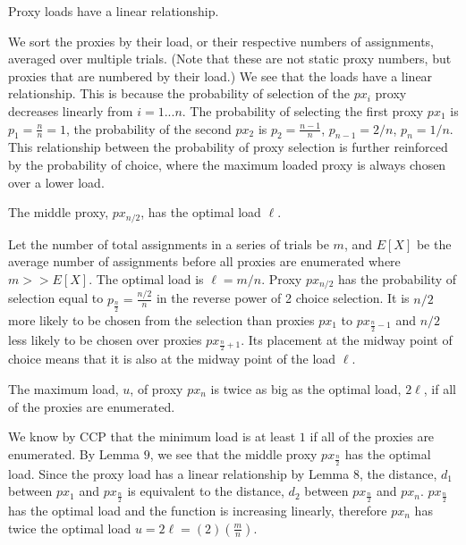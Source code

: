 \begin{lemma}{Proxy loads have a linear relationship.}

We sort the proxies by their load, or their respective numbers of assignments, averaged over multiple trials. (Note that these are not static proxy numbers, but proxies that are numbered by their load.) We see that the loads have a linear relationship. This is because the probability of selection of the $px_i$ proxy decreases linearly from $i=1...n$. The probability of selecting the first proxy $px_1$ is $p_1=\frac{n}{n}=1$, the probability of the second $px_2$ is $p_2=\frac{n-1}{n}$, $p_{n-1}=2/n$, $p_{n}=1/n$. This relationship between the probability of proxy selection is further reinforced by the probability of choice, where the maximum loaded proxy is always chosen over a lower load.
\end{lemma}

\begin{lemma}{The middle proxy, $px_{n/2}$, has the optimal load $\ell$.}

Let the number of total assignments in a series of trials be $m$, and $E[X]$ be the average number of assignments before all proxies are enumerated where $m>>E[X]$. The optimal load is $\ell=m/n$. Proxy $px_{n/2}$ has the probability of selection equal to $p_{\frac{n}{2}}=\frac{n/2}{n}$ in the reverse power of 2 choice selection. It is $n/2$ more likely to be chosen from the selection than proxies $px_1$ to $px_{\frac{n}{2} - 1}$ and $n/2$ less likely to be chosen over proxies $px_{\frac{n}{2} + 1}$. Its placement at the midway point of choice means that it is also at the midway point of the load $\ell$. 
\end{lemma}

\begin{theorem}{The maximum load, $u$, of proxy $px_n$ is twice as big as the optimal load, $2\ell$, if all of the proxies are enumerated.}

We know by CCP that the minimum load is at least $1$ if all of the proxies are enumerated. By Lemma $9$, we see that the middle proxy $px_{\frac{n}{2}}$ has the optimal load. Since the proxy load has a linear relationship by Lemma $8$, the distance, $d_1$ between $px_1$ and $px_{\frac{n}{2}}$ is equivalent to the distance, $d_2$ between $px_{\frac{n}{2}}$ and $px_n$. $px_{\frac{n}{2}}$ has the optimal load and the function is increasing linearly, therefore $px_{n}$ has twice the optimal load $u = 2\ell =(2)(\frac{m}{n})$.

\end{theorem}

